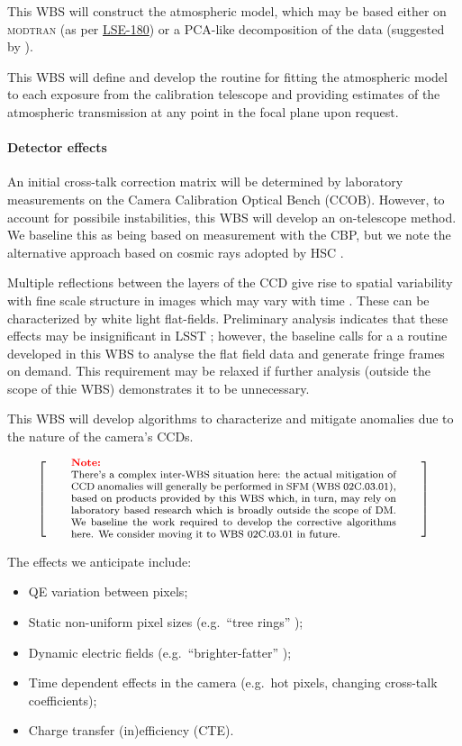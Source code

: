 \documentclass[12pt]{article}
\newcommand{\ds}[2]{{\color{blue} \href{https://docushare.lsstcorp.org/docushare/dsweb/Get/#1}{#2}}\xspace}
\newcommand{\NewPCP}{\ds{LSE-180}{LSE-180}}
\newcommand{\wbsSFM}{WBS 02C.03.01}
\newenvironment{note}[1][Note]
{
  \begin{displaymath}
    \left[ \qquad
    \begin{minipage}[h]{.75\linewidth}
      \color{red} \footnotesize
      \textbf{#1:} \newline
      \color{black}
}
{
    \end{minipage}
    \normalsize
    \qquad \right]
  \end{displaymath}
}
\begin{document}
This WBS will construct the atmospheric model, which may be based either on \textsc{modtran} (as per \NewPCP{}) or a PCA-like decomposition of the data (suggested by \cite{Lupton15}).

This WBS will define and develop the routine for fitting the atmospheric model to each exposure from the calibration telescope and providing estimates of the atmospheric transmission at any point in the focal plane upon request.

\paragraph{Detector effects}

An initial cross-talk correction matrix will be determined by laboratory measurements on the Camera Calibration Optical Bench (CCOB). However, to account for possibile instabilities, this WBS will develop an on-telescope method. We baseline this as being based on measurement with the CBP, but we note the alternative approach based on cosmic rays adopted by HSC \cite{Furusawa14}.

Multiple reflections between the layers of the CCD give rise to spatial variability with fine scale structure in images which may vary with time \cite[\S2.5.1]{Lupton15}. These can be characterized by white light flat-fields. Preliminary analysis indicates that these effects may be insignificant in LSST \cite{Rasmussen15}; however, the baseline calls for a a routine developed in this WBS to analyse the flat field data and generate fringe frames on demand. This requirement may be relaxed if further analysis (outside the scope of thie WBS) demonstrates it to be unnecessary.


This WBS will develop algorithms to characterize and mitigate anomalies due to the nature of the camera's CCDs.

\begin{note}
There's a complex inter-WBS situation here: the actual mitigation of CCD anomalies will generally be performed in SFM (\wbsSFM{}), based on products provided by this WBS which, in turn, may rely on laboratory based research which is broadly outside the scope of DM\@. We baseline the work required to develop the corrective algorithms here. We consider moving it to \wbsSFM{} in future.
\end{note}

The effects we anticipate include:

\begin{itemize}
  \item{QE variation between pixels;}
  \item{Static non-uniform pixel sizes (e.g.\ ``tree rings'' \cite{Stubbs14});}
  \item{Dynamic electric fields (e.g.\ ``brighter-fatter'' \cite{Antilogus14});}
  \item{Time dependent effects in the camera (e.g.\ hot pixels, changing cross-talk coefficients);}
  \item{Charge transfer (in)efficiency (CTE).}
\end{itemize}
\end{document}

